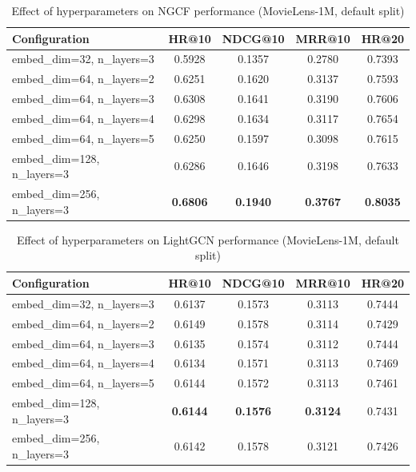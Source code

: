 \documentclass[sigconf,nonacm]{acmart} %
\begin{document}
\begin{table}[ht]  
\caption{Effect of hyperparameters on NGCF performance (MovieLens-1M, default split)}  
\label{tab:ngcf-hyper}  
\centering  
\scriptsize  
\setlength{\tabcolsep}{4pt}  
\begin{tabular}{lcccc}  
\hline  
\textbf{Configuration} & \textbf{HR@10} & \textbf{NDCG@10} & \textbf{MRR@10} & \textbf{HR@20} \\
\hline  
embed\_dim=32, n\_layers=3 & 0.5928 & 0.1357 & 0.2780 & 0.7393 \\
embed\_dim=64, n\_layers=2 & 0.6251 & 0.1620 & 0.3137 & 0.7593 \\
embed\_dim=64, n\_layers=3 & 0.6308 & 0.1641 & 0.3190 & 0.7606 \\
embed\_dim=64, n\_layers=4 & 0.6298 & 0.1634 & 0.3117 & 0.7654 \\
embed\_dim=64, n\_layers=5 & 0.6250 & 0.1597 & 0.3098 & 0.7615 \\
embed\_dim=128, n\_layers=3 & 0.6286 & 0.1646 & 0.3198 & 0.7633 \\
embed\_dim=256, n\_layers=3 & \textbf{0.6806} & \textbf{0.1940} & \textbf{0.3767} & \textbf{0.8035} \\
\hline  
\end{tabular}  
\end{table}  

\begin{table}[ht]  
\caption{Effect of hyperparameters on LightGCN performance (MovieLens-1M, default split)}  
\label{tab:lightgcn-hyper}  
\centering  
\scriptsize  
\setlength{\tabcolsep}{4pt}  
\begin{tabular}{lcccc}  
\hline  
\textbf{Configuration} & \textbf{HR@10} & \textbf{NDCG@10} & \textbf{MRR@10} & \textbf{HR@20} \\
\hline  
embed\_dim=32, n\_layers=3 & 0.6137 & 0.1573 & 0.3113 & 0.7444 \\
embed\_dim=64, n\_layers=2 & 0.6149 & 0.1578 & 0.3114 & 0.7429 \\
embed\_dim=64, n\_layers=3 & 0.6135 & 0.1574 & 0.3112 & 0.7444 \\
embed\_dim=64, n\_layers=4 & 0.6134 & 0.1571 & 0.3113 & 0.7469 \\
embed\_dim=64, n\_layers=5 & 0.6144 & 0.1572 & 0.3113 & 0.7461 \\
embed\_dim=128, n\_layers=3 & \textbf{0.6144} & \textbf{0.1576} & \textbf{0.3124} & 0.7431 \\
embed\_dim=256, n\_layers=3 & 0.6142 & 0.1578 & 0.3121 & 0.7426 \\
\hline  
\end{tabular}  
\end{table}  
\end{document}
